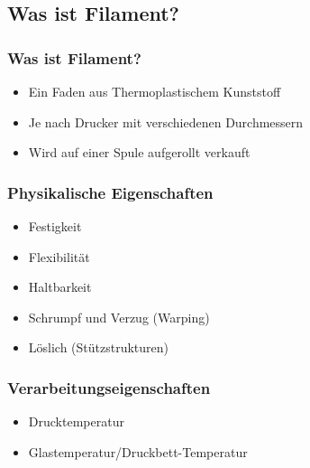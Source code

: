 \subsection{Was ist Filament?}
{
\begin{frame}
  \frametitle{Was ist Filament?} \pause
  \begin{itemize}
    \item Ein Faden aus Thermoplastischem Kunststoff \pause
    \item Je nach Drucker mit verschiedenen Durchmessern \pause
    \item Wird auf einer Spule aufgerollt verkauft
  \end{itemize}
\end{frame}
\begin{frame}
  \frametitle{Physikalische Eigenschaften}
  \pause
  \begin{itemize}
    \item Festigkeit \pause
    \item Flexibilität \pause
    \item Haltbarkeit \pause
    \item Schrumpf und Verzug (Warping) \pause
    \item Löslich (Stützstrukturen)
  \end{itemize}
\end{frame}

\begin{frame}
  \frametitle{Verarbeitungseigenschaften}
  \pause
  \begin{itemize}
    \item Drucktemperatur \pause
    \item Glastemperatur/Druckbett-Temperatur
  \end{itemize}
\end{frame}
}
